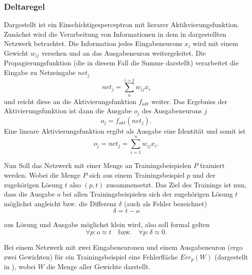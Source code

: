 \subsubsection{Deltaregel}\label{sec:deltaregel}


Dargestellt ist ein Einschichtigesperceptron mit lierarer Aktikvierungsfunktion.
Zunächst wird die Verarbeitung von Informationen in dem in  dargestellten Netzwerk betrachtet. Die Information jedes Eingabeneurons $x_i$ wird mit einem Gewicht $w_{ij}$ versehen und an das Ausgabeneuron weitergeleitet. Die Propagierungsfunktion (die in diesem Fall die Summe darstellt) verarbeitet die Eingabe zu Netzeingabe $net_j$
\begin{equation}
net_j= \sum^{i=1}_n w_{ij} x_i
\end{equation}
und reicht diese an die Aktivierungsfunktion $f_{akt}$ weiter. Das Ergebniss der Aktivierungsfunktion ist dann die Ausgabe $o_j$ des Ausgabeneurons $j$
\begin{equation}
o_j= f_{akt}(net_j).
\end{equation}
Eine lineare Aktivierungsfunktion ergibt als Ausgabe eine Identität und somit ist
\begin{equation}
o_j= net_j= \sum_{i=1}^n w_{ij} x_i.
\label{gl:ausgang}
\end{equation}

Nun Soll das Netzwerk mit einer Menge an Trainingsbeispielen $P$ trainiert werden. Wobei die Menge $P$ sich aus einem Trainingsbeispiel $p$ und der zugehörigen Lösung $t$ also $(p,t)$ zusammensetzt.
Das Ziel des Trainings ist nun, dass die Ausgabe $o$ bei allen Trainingsbeispielen sich der zugehörigen Lösung $t$ möglichst angleicht bzw. die Differenz $\delta$ (auch als Fehler bezeichnet) 
\begin{equation}
\delta=t-o
\label{gl:delta}
\end{equation}

aus Lösung und Ausgabe möglichst klein  wird, also soll formal gelten
\begin{equation*}
\forall p:o \approx t \quad \text{bzw.} \quad \forall p:\delta \approx 0.
\end{equation*}

Bei einem Netzwerk mit zwei Eingabeneuronen und einem Ausgabeneuron (ergo zwei Gewichten) für ein Trainingsbeispiel eine Fehlerfläche $Err_p(W)$ (dargestellt in ), wobei $W$ die Menge aller Gewichte darstellt.

